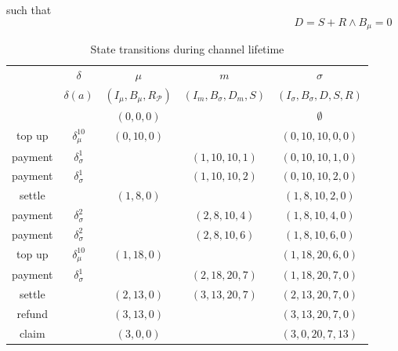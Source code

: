 \documentclass{llncs}
\begin{document}
such that
$$D = S + R \land B_\mu = 0$$

\begin{table}[t]
  \begin{tabularx}{\textwidth}{| S | S | C | C | C |}
       & $\delta$ & $\mu$ & $m$ & $\sigma$ \\ 
       & $\delta(a)$ & $(I_\mu,B_\mu,R_\mathcal{P})$ & $(I_m,B_\sigma,D_m,S)$ & $(I_\sigma,B_\sigma,D,S,R)$ \\
  \hhline{~====}
       & & $(0,0,0)$ & & $\emptyset$ \\ 
      top up  & $\delta_\mu^{10}$   & $(0,10,0)$ &               & $(0,10,10,0,0)$ \\
      payment & $\delta_\sigma^1$ &            & $(1,10,10,1)$ & $(0,10,10,1,0)$ \\
      payment & $\delta_\sigma^1$ &            & $(1,10,10,2)$ & $(0,10,10,2,0)$ \\
      settle  &                    & $(1,8,0)$  &               & $(1,8,10,2,0)$ \\
      payment & $\delta_\sigma^2$ &            & $(2,8,10,4)$  & $(1,8,10,4,0)$ \\
      payment & $\delta_\sigma^2$ &            & $(2,8,10,6)$  & $(1,8,10,6,0)$ \\
      top up  & $\delta_\mu^{10}$   & $(1,18,0)$ &               & $(1,18,20,6,0)$ \\
      payment & $\delta_\sigma^1$ &            & $(2,18,20,7)$ & $(1,18,20,7,0)$ \\
      settle  &                    & $(2,13,0)$ & $(3,13,20,7)$ & $(2,13,20,7,0)$ \\
      refund  &                    & $(3,13,0)$ &               & $(3,13,20,7,0)$ \\
      claim   &                    & $(3,0,0)$  &               & $(3,0,20,7,13)$ \\
  \end{tabularx}
  \medskip
  \caption{State transitions during channel lifetime}
\end{table}
\end{document}

